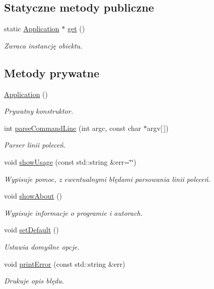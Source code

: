 \subsection*{\-Statyczne metody publiczne}
\begin{DoxyCompactItemize}
\item 
static \hyperlink{class_application}{\-Application} $\ast$ \hyperlink{class_application_af74c95b803fba6c2a5fd47a3ae5fda36}{get} ()
\begin{DoxyCompactList}\small\item\em \-Zwraca instancję obiektu. \end{DoxyCompactList}\end{DoxyCompactItemize}
\subsection*{\-Metody prywatne}
\begin{DoxyCompactItemize}
\item 
\hyperlink{class_application_afa8cc05ce6b6092be5ecdfdae44e05f8}{\-Application} ()
\begin{DoxyCompactList}\small\item\em \-Prywatny konstruktor. \end{DoxyCompactList}\item 
int \hyperlink{class_application_a2013314d883802bfb12b6b445d5dabce}{parse\-Command\-Line} (int argc, const char $\ast$argv\mbox{[}$\,$\mbox{]})
\begin{DoxyCompactList}\small\item\em \-Parser linii poleceń. \end{DoxyCompactList}\item 
void \hyperlink{class_application_a347b2679d939278e31d7c6bafcd1f4c1}{show\-Usage} (const std\-::string \&err=\char`\"{}\char`\"{})
\begin{DoxyCompactList}\small\item\em \-Wypisuje pomoc, z ewentualnymi błędami parsowania linii poleceń. \end{DoxyCompactList}\item 
void \hyperlink{class_application_a182ef99a13c7e3b34faa6efe83375b01}{show\-About} ()
\begin{DoxyCompactList}\small\item\em \-Wypisuje informacje o programie i autorach. \end{DoxyCompactList}\item 
void \hyperlink{class_application_a8b2fa959a43f20b8c58f7e0d0ed0bc93}{set\-Default} ()
\begin{DoxyCompactList}\small\item\em \-Ustawia domyślne opcje. \end{DoxyCompactList}\item 
void \hyperlink{class_application_ae643f111fbb13606e91cf9156da09299}{print\-Error} (const std\-::string \&err)
\begin{DoxyCompactList}\small\item\em \-Drukuje opis błędu. \end{DoxyCompactList}\end{DoxyCompactItemize}
